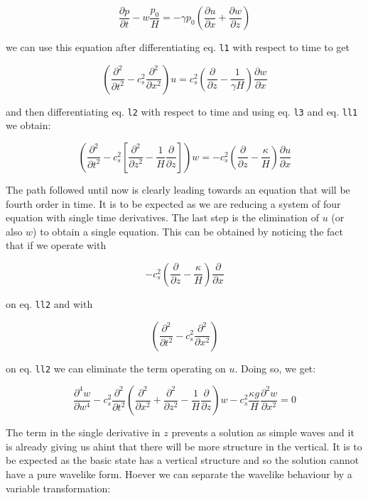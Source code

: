 \[\frac{\partial p}{\partial t}  -w\frac{p_0}{H} = -\gamma p_0 \left( \frac{\partial u}{\partial x}+\frac{\partial w}{\partial z} \right)\]

we can use this equation after differentiating eq. \texttt{l1} with
respect to time to get

{\[\left(\frac{\partial^{2} }{\partial t^{2}} -c_s^2\frac{\partial^{2} }{\partial x^{2}}\right)u = c_s^2 \left( \frac{\partial }{\partial z} -\frac{1}{\gamma H} \right)\frac{\partial w}{\partial x}\]}

and then differentiating eq. \texttt{l2} with respect to time and using
eq. \texttt{l3} and eq. \texttt{ll1} we obtain:

{\[\left(\frac{\partial^{2} }{\partial t^{2}} -c_s^2\left[ \frac{\partial^{2} }{\partial z^{2}} -\frac{1}{H}\frac{\partial }{\partial z}\right] \right) w = -c_s^2\left( \frac{\partial }{\partial z} -\frac{\kappa}{H}\right) \frac{\partial u}{\partial x}\]}

The path followed until now is clearly leading towards an equation that
will be fourth order in time. It is to be expected as we are reducing a
system of four equation with single time derivatives. The last step is
the elimination of \(u\) (or also \(w\)) to obtain a single equation.
This can be obtained by noticing the fact that if we operate with

\[-c_s^2\left( \frac{\partial }{\partial z} -\frac{\kappa}{H}\right) \frac{\partial }{\partial x}\]

on eq. \texttt{ll2} and with

\[\left(\frac{\partial^{2} }{\partial t^{2}} -c_s^2\frac{\partial^{2} }{\partial x^{2}}\right)\]

on eq. \texttt{ll2} we can eliminate the term operating on \(u\). Doing
so, we get:

{\[\frac{\partial^4 w}{\partial w^4} -c_s^2\frac{\partial^{2} }{\partial t^{2}} \left(\frac{\partial^{2} }{\partial x^{2}} +\frac{\partial^{2} }{\partial z^{2}}-\frac{1}{H}\frac{\partial }{\partial z}\right)w  -c_s^2 \frac{\kappa g}{H}\frac{\partial^{2} w}{\partial x^{2}} = 0\]}

The term in the single derivative in \(z\) prevents a solution as simple
waves and it is already giving us ahint that there will be more
structure in the vertical. It is to be expected as the basic state has a
vertical structure and so the solution cannot have a pure wavelike form.
Hoever we can separate the wavelike behaviour by a variable
transformation:

